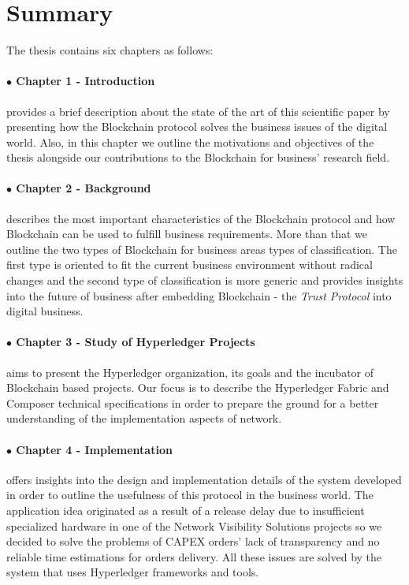 \section{Summary}
\label{sec:intro-sec4}
The thesis contains six chapters as follows:

\paragraph{$\bullet$ Chapter 1 - Introduction} provides a brief description about the state of the art of this scientific paper by presenting how the Blockchain protocol solves the business issues of the digital world. Also, in this chapter we outline the motivations and objectives of the thesis alongside our contributions to the Blockchain for business' research field.

\paragraph{$\bullet$ Chapter 2 - Background} describes the most important characteristics of the Blockchain protocol and how Blockchain can be used to fulfill business requirements. More than that we outline the two types of Blockchain for business areas types of classification. The first type is oriented to fit the current business environment without radical changes and the second type of classification is more generic and provides insights into the future of business after embedding Blockchain - the \emph{Trust Protocol} into digital business.

\paragraph{$\bullet$ Chapter 3 - Study of Hyperledger Projects} aims to present the Hyperledger organization, its goals and the incubator of Blockchain based projects. Our focus is to describe the Hyperledger Fabric and Composer technical specifications in order to prepare the ground for a better understanding of  the implementation aspects of {\project} network.  

\paragraph{$\bullet$ Chapter 4 - Implementation} offers insights into the design and implementation details of the {\project} system developed in order to outline the usefulness of this protocol in the business world. The application idea originated as a result of a release delay due to insufficient specialized hardware in one of the Network Visibility Solutions projects so we decided to solve the problems of CAPEX orders' lack of transparency and no reliable time estimations for orders delivery. All these issues are solved by the {\project} system that uses Hyperledger frameworks and tools.

